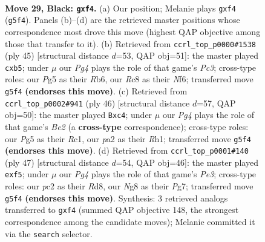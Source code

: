 \documentclass[11pt]{article}
\begin{document}
\clearpage

\begin{figure}[p]\centering
\begin{subfigure}{0.46\textwidth}\centering
\resizebox{\linewidth}{!}{%
\newchessgame
\chessboard[
  setfen={2rb2nr/p4k1p/2p5/6p1/5P2/3B3P/PPP2KPB/RR6 b - - 0 29},
  showmover=false,
  pgfstyle=straightmove, color=movearrow, markmove={g5-f4}
]}
\caption{}
\end{subfigure}\hfill
\begin{subfigure}{0.46\textwidth}\centering
\resizebox{\linewidth}{!}{%
\newchessgame
\chessboard[
  setfen={2b2rk1/7p/1rp2np1/pP6/8/2P1R3/1P1NB1PP/3R2K1 b - - 0 23},
  showmover=false,
  pgfstyle=straightmove, color=movearrow, markmove={c6-b5}
]}
\caption{}
\end{subfigure}
\\[4pt]
\begin{subfigure}{0.46\textwidth}\centering
\resizebox{\linewidth}{!}{%
\newchessgame
\chessboard[
  setfen={3rk2r/5p1p/p1P1b1p1/4p3/2p5/1P6/4BPPP/2R1K2R w Kk - 0 24},
  showmover=false,
  pgfstyle=straightmove, color=movearrow, markmove={e2-c4}
]}
\caption{}
\end{subfigure}\hfill
\begin{subfigure}{0.46\textwidth}\centering
\resizebox{\linewidth}{!}{%
\newchessgame
\chessboard[
  setfen={r2r2k1/1p4pp/np2p3/5P2/6P1/5R2/PP2B2P/1R5K b - - 0 24},
  showmover=false,
  pgfstyle=straightmove, color=movearrow, markmove={e6-f5}
]}
\caption{}
\end{subfigure}
\caption{\textbf{Move 29, Black: \texttt{gxf4}.} (a) Our position; Melanie plays \texttt{gxf4} (\texttt{g5f4}). Panels (b)--(d) are the retrieved master positions whose correspondence most drove this move (highest QAP objective among those that transfer to it). (b) Retrieved from \texttt{ccrl\_top\_p0000\#1538} (ply 45) [structural distance $d$=53, QAP obj=51]: the master played \texttt{cxb5}; under $\mu$ our \emph{Pg4} plays the role of that game's \emph{Pc3}; cross-type roles: our \emph{P}g5 as their \emph{R}b6, our \emph{R}c8 as their \emph{N}f6; transferred move \texttt{g5f4} \textbf{(endorses this move)}. (c) Retrieved from \texttt{ccrl\_top\_p0002\#941} (ply 46) [structural distance $d$=57, QAP obj=50]: the master played \texttt{Bxc4}; under $\mu$ our \emph{Pg4} plays the role of that game's \emph{Be2} (a \textbf{cross-type} correspondence); cross-type roles: our \emph{P}g5 as their \emph{R}c1, our \emph{p}a2 as their \emph{R}h1; transferred move \texttt{g5f4} \textbf{(endorses this move)}. (d) Retrieved from \texttt{ccrl\_top\_p0001\#140} (ply 47) [structural distance $d$=54, QAP obj=46]: the master played \texttt{exf5}; under $\mu$ our \emph{Pg4} plays the role of that game's \emph{Pe3}; cross-type roles: our \emph{p}c2 as their \emph{R}d8, our \emph{N}g8 as their \emph{P}g7; transferred move \texttt{g5f4} \textbf{(endorses this move)}. Synthesis: 3 retrieved analogs transferred to \texttt{gxf4} (summed QAP objective 148, the strongest correspondence among the candidate moves); Melanie committed it via the \texttt{search} selector.}
\label{fig:thought-m57}
\end{figure}
\end{document}
